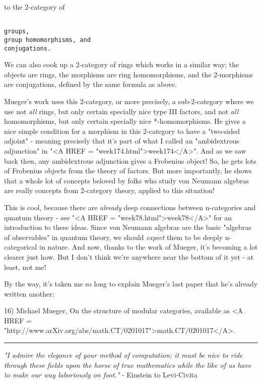 to the 2-category of


\begin{verbatim}

groups,
group homomorphisms, and
conjugations.
\end{verbatim}
    

We can also cook up a 2-category of rings which works in a similar way;
the objects are rings, the morphisms are ring homomorphisms, and the
2-morphisms are conjugations, defined by the same formula as above.

Mueger's work uses this 2-category, or more precisely, a sub-2-category
where we use not \emph{all} rings, but only certain specially nice type III 
factors, and not \emph{all} homomorphisms, but only certain specially nice
*-homomorphisms.  He gives a nice simple condition for a morphism in
this 2-category to have a "two-sided adjoint" - meaning precisely 
that it's part of what I called an "ambidextrous adjunction" 
in "<A HREF = "week174.html">week174</A>".
And as we saw back then, any ambidextrous adjunction gives a Frobenius
object!  So, he gets lots of Frobenius objects from the theory of factors.  
But more importantly, he shows that a whole lot of concepts beloved by
folks who study von Neumann algebras are really concepts from 2-category
theory, applied to this situation! 

This is cool, because there are \emph{already} deep connections between 
n-categories and quantum theory - see "<A HREF = "week78.html">week78</A>" for an introduction 
to these ideas.  Since von Neumann algebras are the basic "algebras
of observables" in quantum theory, we should \emph{expect} 
them to be deeply 
n-categorical in nature.  And now, thanks to the work of Mueger, it's 
becoming a lot clearer just how.  But I don't think we're anywhere 
near the bottom of it yet - at least, not me!

By the way, it's taken me so long to explain Mueger's last paper that
he's already written another:

16) Michael Mueger, On the structure of modular categories, available
as <A HREF = "http://www.arXiv.org/abs/math.CT/0201017">math.CT/0201017</A>.




\par\noindent\rule{\textwidth}{0.4pt}
\emph{"I admire the elegance of your method of computation; it must be nice to ride through these fields upon the horse of true mathematics while the like of us have to make our way laboriously on foot."} - Einstein to Levi-Civita 
